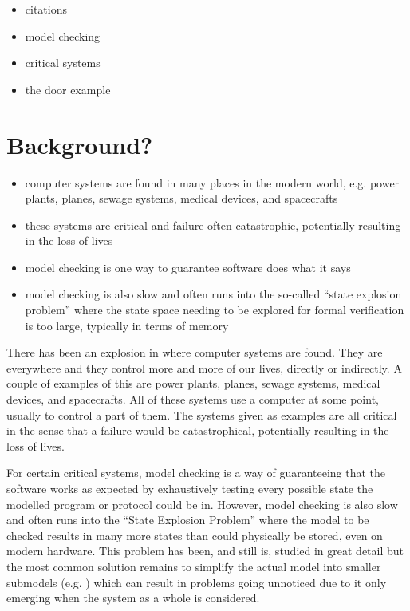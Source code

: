 \documentclass[11pt]{article}
\begin{document}
    \begin{itemize}
        \item citations
        \item model checking
        \item critical systems
        \item the door example
    \end{itemize}

    \section*{Background?}
    \begin{itemize}
        \item computer systems are found in many places in the modern world,
              e.g. power plants, planes, sewage systems, medical devices, and
              spacecrafts
        \item these systems are critical and failure often catastrophic,
              potentially resulting in the loss of lives
        \item model checking is one way to guarantee software does what it says
        \item model checking is also slow and often runs into the so-called
              ``state explosion problem'' where the state space needing to be
              explored for formal verification is too large, typically in terms
              of memory
    \end{itemize}

    There has been an explosion in where computer systems are found. They are
    everywhere and they control more and more of our lives, directly or
    indirectly. A couple of examples of this are power plants, planes, sewage
    systems, medical devices, and spacecrafts. All of these systems use a
    computer at some point, usually to control a part of them. The systems
    given as examples are all critical in the sense that a failure would be
    catastrophical, potentially resulting in the loss of lives.
    
    For certain critical systems, model checking is a way of guaranteeing that
    the software works as expected by exhaustively testing every possible state
    the modelled program or protocol could be in. However, model checking is
    also slow and often runs into the ``State Explosion Problem''
    \cite{goos_state_1998} where the model to be checked results in many more
    states than could physically be stored, even on modern hardware. This
    problem has been, and still is, studied in great detail
    \cite{goos_progress_2001,stuart_simulation-verification_2001,demri_parametric_2006,clarke_model_2008,kress-gazit_correct_2011,meyer_model_2012}
    but the most common solution remains to simplify the actual model into
    smaller submodels (e.g. \cite{yan_sun_verifying_2007}) which can result in
    problems going unnoticed due to it only emerging when the system as a whole
    is considered.\\
    
\end{document}
